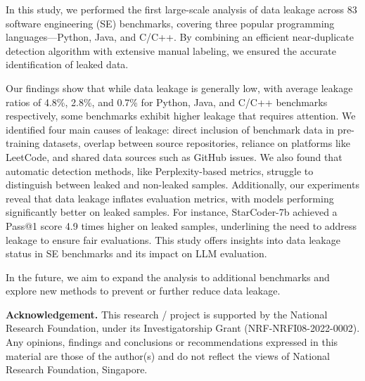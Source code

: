 


In this study, we performed the first large-scale analysis of data leakage across 83 software engineering (SE) benchmarks, covering three popular programming languages—Python, Java, and C/C++. By combining an efficient near-duplicate detection algorithm with extensive manual labeling, we ensured the accurate identification of leaked data.



Our findings show that while data leakage is generally low, with average leakage ratios of 4.8\%, 2.8\%, and 0.7\% for Python, Java, and C/C++ benchmarks respectively, some benchmarks exhibit higher leakage that requires attention. We identified four main causes of leakage: direct inclusion of benchmark data in pre-training datasets, overlap between source repositories, reliance on platforms like LeetCode, and shared data sources such as GitHub issues.
We also found that automatic detection methods, like Perplexity-based metrics, struggle to distinguish between leaked and non-leaked samples. Additionally, our experiments reveal that data leakage inflates evaluation metrics, with models performing significantly better on leaked samples. For instance, StarCoder-7b achieved a Pass@1 score 4.9 times higher on leaked samples, underlining the need to address leakage to ensure fair evaluations.
This study offers insights into data leakage status in SE benchmarks and its impact on LLM evaluation.


In the future, we aim to expand the analysis to additional benchmarks and explore new methods to prevent or further reduce data leakage.





\vspace{0.2cm}
\noindent \textbf{Acknowledgement.}  This research / project is supported by the National Research Foundation, under its Investigatorship Grant (NRF-NRFI08-2022-0002). Any opinions, findings and conclusions or recommendations expressed in this material are those of the author(s) and do not reflect the views of National Research Foundation, Singapore.

